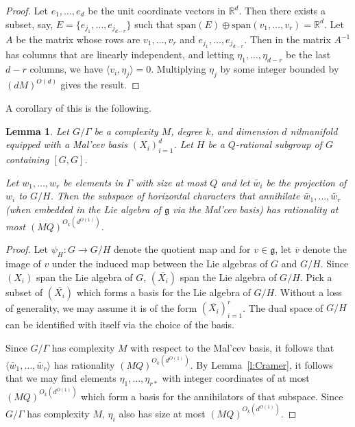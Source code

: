 \documentclass[11pt, a4paper]{amsart}
\theoremstyle{plain}
\theoremstyle{plain}
\newtheorem{lemma}{Lemma}
\theoremstyle{definition}
\theoremstyle{remark}
\numberwithin{equation}{section}
\numberwithin{lemma}{section}
\numberwithin{proposition}{section}
\numberwithin{corollary}{section}
\numberwithin{definition}{section}
\numberwithin{claim}{section}
\begin{document}
\begin{proof}
Let $e_1, \dots, e_d$ be the unit coordinate vectors in $\mathbb{R}^d$. Then there exists a subset, say, $E = \{e_{j_1}, \dots, e_{j_{d - r}}\}$ such that $\text{span}(E) \oplus \text{span}(v_1, \dots, v_r) = \mathbb{R}^d$. Let $A$ be the matrix whose rows are $v_1, \dots, v_r$ and $e_{j_1}, \dots, e_{j_{d - r}}$. Then in the matrix $A^{-1}$ has columns that are linearly independent, and letting $\eta_1, \dots, \eta_{d - r}$ be the last $d - r$ columns, we have $\langle v_i, \eta_j \rangle = 0$. Multiplying $\eta_j$ by some integer bounded by $(dM)^{O(d)}$ gives the result.
\end{proof}
A corollary of this is the following.
\begin{lemma}\label{l:Cramer2}
Let $G/\Gamma$ be a complexity $M$, degree $k$, and dimension $d$ nilmanifold equipped with a Mal'cev basis $(X_i)_{i = 1}^d$. Let $H$ be a $Q$-rational subgroup of $G$ containing $[G, G]$. 

Let $w_1, \dots, w_r$ be elements in $\Gamma$ with size at most $Q$ and let $\tilde{w_i}$ be the projection of $w_i$ to $G/H$. Then the subspace of horizontal characters that annihilate $\tilde{w_1}, \dots, \tilde{w_r}$ (when embedded in the Lie algebra of $\mathfrak{g}$ via the Mal'cev basis) has rationality at most $(MQ)^{O_k(d^{O(1)})}$.
\end{lemma}
\begin{proof}
Let $\psi_{H} : G \to G/H$ denote the quotient map and for $v \in \mathfrak{g}$, let $\overline{v}$ denote the image of $v$ under the induced map between the Lie algebras of $G$ and $G/H$. Since $(X_i)$ span the Lie algebra of $G$,  $(\overline{X_i})$ span the Lie algebra of $G/H$. Pick a subset of $(\overline{X_i})$ which forms a basis for the Lie algebra of $G/H$. Without a loss of generality, we may assume it is of the form $(\overline{X_i})_{i = 1}^r$. The dual space of $G/H$ can be identified with itself via the choice of the basis. 

Since $G/\Gamma$ has complexity $M$ with respect to the Mal'cev basis, it follows that $\langle \tilde{w_1}, \dots, \tilde{w_r} \rangle$ has rationality $(MQ)^{O_k(d^{O(1)})}$. By Lemma~\ref{l:Cramer}, it follows that we may find elements $\eta_1, \dots, \eta_{r*}$ with integer coordinates of at most $(MQ)^{O_k(d^{O(1)})}$ which form a basis for the annihilators of that subspace. Since $G/\Gamma$ has complexity $M$, $\eta_i$ also has size at most $(MQ)^{O_k(d^{O(1)})}$.
\end{proof}
\end{document}
